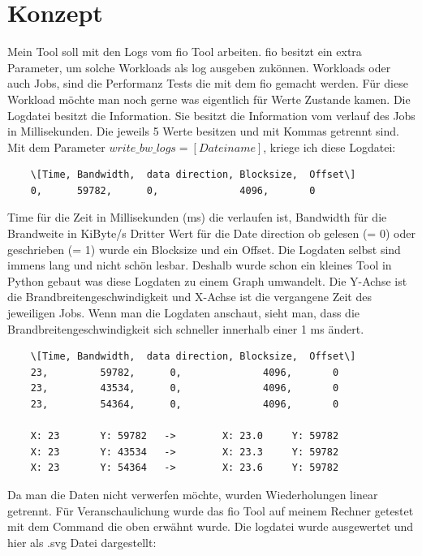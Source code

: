 \documentclass{article}
\begin{document}
\section{Konzept}
Mein Tool soll mit den Logs vom fio Tool arbeiten. \newline
fio besitzt ein extra Parameter, um solche Workloads als log ausgeben zukönnen.
Workloads oder auch Jobs, sind die Performanz Tests die mit dem fio gemacht werden.
Für diese Workload möchte man noch gerne was eigentlich für Werte Zustande kamen.
Die Logdatei besitzt die Information. Sie besitzt die Information vom verlauf des Jobs in Millisekunden.
Die jeweils 5 Werte besitzen und mit Kommas getrennt sind.
Mit dem Parameter $write\_bw\_logs=[Dateiname]$, kriege ich diese Logdatei:
\begin{lstlisting}
    \[Time,	Bandwidth,	data direction, Blocksize,	Offset\]
    0, 	    59782, 		0,		        4096,		0
\end{lstlisting}
Time für die Zeit in Millisekunden (ms) die verlaufen ist, Bandwidth für die Brandweite in KiByte/s
Dritter Wert für die Date direction ob gelesen (= 0) oder geschrieben (= 1) wurde ein Blocksize
und ein Offset. Die Logdaten selbst sind immens lang und nicht schön lesbar. Deshalb wurde schon ein kleines Tool in Python gebaut 
was diese Logdaten zu einem Graph umwandelt. 
Die Y-Achse ist die Brandbreitengeschwindigkeit und X-Achse ist die vergangene Zeit des jeweiligen Jobs.
Wenn man die Logdaten anschaut, sieht man, dass die Brandbreitengeschwindigkeit sich schneller innerhalb einer 1 ms ändert.
\newpage
\begin{lstlisting}
    \[Time,	Bandwidth,	data direction, Blocksize,	Offset\]
    23, 	    59782, 		0,		        4096,		0
    23, 	    43534, 		0,		        4096,		0
    23, 	    54364, 		0,		        4096,		0

    X: 23       Y: 59782   ->        X: 23.0     Y: 59782
    X: 23       Y: 43534   ->        X: 23.3     Y: 59782
    X: 23       Y: 54364   ->        X: 23.6     Y: 59782
\end{lstlisting}
Da man die Daten nicht verwerfen möchte, wurden Wiederholungen linear getrennt. 
Für Veranschaulichung wurde das fio Tool auf meinem Rechner getestet mit dem
Command die oben erwähnt wurde. Die logdatei wurde ausgewertet und hier als .svg Datei dargestellt:
\\
\end{document}
